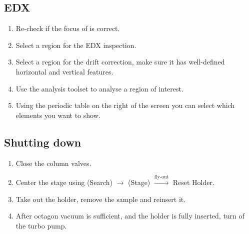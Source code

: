 \documentclass[a4paper]{scrartcl}
\begin{document}
\subsection*{EDX}
\begin{enumerate}
    \item Re-check if the focus of is correct.
    \item Select a region for the EDX inspection.
    \item Select a region for the drift correction, make sure it has well-defined horizontal and vertical features.
    \item Use the analysis toolset to analyse a region of interest.
    \item Using the periodic table on the right of the screen you can select which elements you want to show.
\end{enumerate}

\subsection*{Shutting down}
\begin{enumerate}
    \item Close the column valves.
    \item Center the stage using (Search) $\rightarrow$ (Stage) $\xrightarrow{\text{fly-out}}$ Reset Holder.
    \item Take out the holder, remove the sample and reinsert it.
    \item After octagon vacuum is sufficient, and the holder is fully inserted, turn of the turbo pump.
\end{enumerate}
\end{document}
